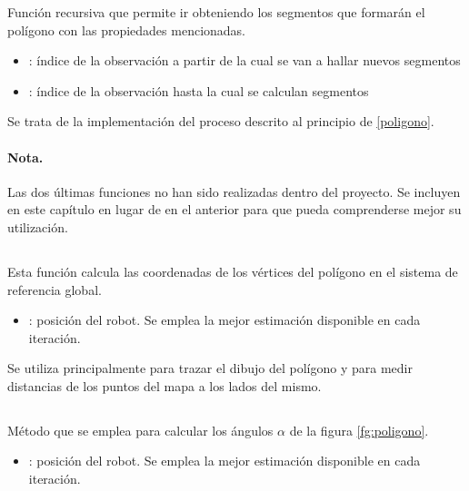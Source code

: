 \noindent
Función recursiva que permite ir obteniendo los segmentos que formarán el polígono con las propiedades mencionadas.

\begin{itemize}
  \item {}: índice de la observación a partir de la cual se van a hallar nuevos segmentos
  \item {}: índice de la observación hasta la cual se calculan segmentos
\end{itemize}

Se trata de la implementación del proceso descrito al principio de \ref{poligono}.

\paragraph{Nota.}
Las dos últimas funciones no han sido realizadas dentro del proyecto. Se incluyen en este capítulo en lugar de en el anterior para que pueda comprenderse mejor su utilización.

\subsection{}


\noindent
Esta función calcula las coordenadas de los vértices del polígono en el sistema de referencia global.

\begin{itemize}
  \item {}: posición del robot. Se emplea la mejor estimación disponible en cada iteración.
\end{itemize}

Se utiliza principalmente para trazar el dibujo del polígono y para medir distancias de los puntos del mapa a los lados del mismo.

\subsection{}


\noindent
Método que se emplea para calcular los ángulos $\alpha$ de la figura \ref{fg:poligono}.

\begin{itemize}
  \item {}: posición del robot. Se emplea la mejor estimación disponible en cada iteración.
\end{itemize}

